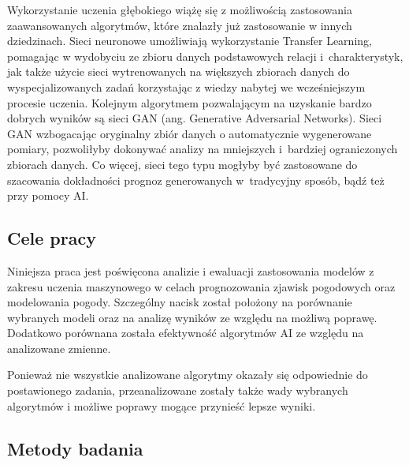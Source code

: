 Wykorzystanie uczenia głębokiego wiążę się z możliwością zastosowania 
zaawansowanych algorytmów, które znalazły już zastosowanie w innych dziedzinach.
Sieci neuronowe umożliwiają wykorzystanie Transfer Learning, pomagając w
wydobyciu ze zbioru danych podstawowych relacji i~charakterystyk, jak także
użycie sieci wytrenowanych na większych zbiorach danych do wyspecjalizowanych
zadań korzystając z wiedzy nabytej we wcześniejszym procesie uczenia. Kolejnym 
algorytmem pozwalającym na uzyskanie bardzo dobrych wyników są sieci GAN (ang. 
Generative Adversarial Networks). Sieci GAN wzbogacając oryginalny zbiór danych o
automatycznie wygenerowane pomiary, pozwoliłyby dokonywać analizy na mniejszych i~bardziej ograniczonych zbiorach danych. Co więcej, sieci tego typu mogłyby
być zastosowane do szacowania dokładności prognoz generowanych w~tradycyjny sposób,
bądź też przy pomocy AI.


\subsection{Cele pracy}


Niniejsza praca jest poświęcona analizie i ewaluacji zastosowania modelów 
z zakresu uczenia maszynowego w celach prognozowania zjawisk pogodowych oraz
modelowania pogody. Szczególny nacisk został położony na porównanie wybranych
modeli oraz na analizę wyników ze względu na możliwą poprawę. Dodatkowo 
porównana została efektywność algorytmów AI ze względu na analizowane zmienne.

Ponieważ nie wszystkie analizowane algorytmy okazały się odpowiednie do postawionego
zadania, przeanalizowane zostały także wady wybranych algorytmów i możliwe poprawy
mogące przynieść lepsze wyniki.

\subsection{Metody badania}

